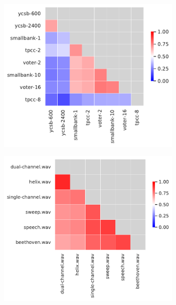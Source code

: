 \begin{figure}
	\begin{subfigure}{0.33\textwidth}
		\centering
		\includegraphics[width=\linewidth]{images/rq1/kendall_h2.pdf}
		\caption{\htwo}
	\end{subfigure}
	\begin{subfigure}{0.33\textwidth}
		\centering
		\includegraphics[width=\linewidth]{images/rq1/kendall_jump3r.pdf}
		\caption{\jumper}
	\end{subfigure}
	\begin{subfigure}{0.33\textwidth}

\end{subfigure}
\end{figure}
